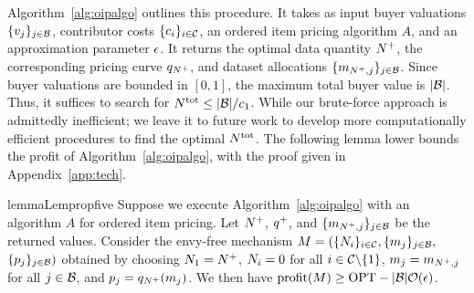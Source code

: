Algorithm~\ref{alg:oipalgo} outlines this procedure.  
It takes as input buyer valuations $\{v_{j}\}_{j\in\mathcal{B}}$, contributor costs $\{c_i\}_{i\in\mathcal{C}}$, an ordered item pricing algorithm $A$, and an approximation parameter $\epsilon$.  
It returns the optimal data quantity $N^{+}$, the corresponding pricing curve $q_{N^{+}}$, and dataset allocations $\{m_{N^{+}, j}\}_{j\in\mathcal{B}}$.  
Since buyer valuations are bounded in $[0,1]$, the maximum total buyer value is $|\mathcal{B}|$.  
Thus, it suffices to search for $N^{\rm tot} \leq |\mathcal{B}|/c_1$.  
%
While our brute-force approach is admittedly inefficient;
we leave it to future work to develop more computationally efficient procedures to find the optimal $N^{\rm tot}$.
The following lemma lower bounds the profit of Algorithm~\ref{alg:oipalgo}, with the proof given in Appendix~\ref{app:tech}.


\begin{restatable}{lemma}{Lempropfive}
    \label{lem:main_prop5}
    Suppose we execute Algorithm~\ref{alg:oipalgo} with an algorithm $A$ for ordered item pricing.
    Let $N^{+}$, $q^{+}$, and $\{m_{N^{+}, j}\}_{j\in\mathcal{B}}$
    be the returned values. %
    Consider the envy-free mechanism $M = (\{N_i\}_{i\in\mathcal{C}}, \{m_j\}_{j\in\mathcal{B}},$ $ \{p_j\}_{j\in\mathcal{B}})$ obtained by choosing
    $N_1=N^{+}$, $N_i=0$ for all $i\in\mathcal{C}\backslash\{1\}$,
    $m_j = m_{N^{+}, j}$ for all $j\in\mathcal{B}$,
    and $p_j = q_{N^{+}}(m_j)$.
    We then have ${\rm profit}(M) \geq {\rm OPT}-|\mathcal{B}|\mathcal{O}(\epsilon)$.
\end{restatable}



